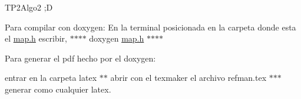 T\+P2\+Algo2 ;D

Para compilar con doxygen\+: En la terminal posicionada en la carpeta donde esta el \hyperlink{map_8h}{map.\+h} escribir, $\ast$$\ast$$\ast$$\ast$ doxygen \hyperlink{map_8h}{map.\+h} $\ast$$\ast$$\ast$$\ast$

Para generar el pdf hecho por el doxygen\+:
\begin{DoxyItemize}
\item entrar en la carpeta latex $\ast$$\ast$ abrir con el texmaker el archivo refman.\+tex $\ast$$\ast$$\ast$ generar como cualquier latex. 
\end{DoxyItemize}